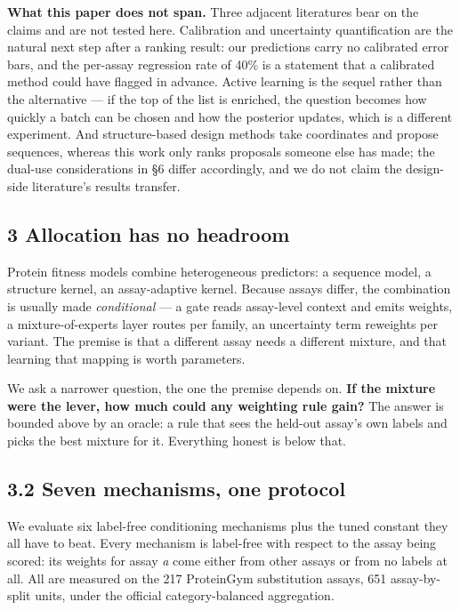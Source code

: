 \textbf{What this paper does not span.} Three adjacent literatures bear on the claims and are not tested
here. Calibration and uncertainty quantification are the natural next step after a ranking result: our
predictions carry no calibrated error bars, and the per-assay regression rate of 40\% is a statement that
a calibrated method could have flagged in advance. Active learning is the sequel rather than the
alternative --- if the top of the list is enriched, the question becomes how quickly a batch can be chosen
and how the posterior updates, which is a different experiment. And structure-based design methods take
coordinates and propose sequences, whereas this work only ranks proposals someone else has made; the
dual-use considerations in §6 differ accordingly, and we do not claim the design-side literature's
results transfer.

\hypertarget{allocation-has-no-headroom}{%
\subsection{3 Allocation has no headroom}\label{allocation-has-no-headroom}}

Protein fitness models combine heterogeneous predictors: a sequence model, a structure kernel, an
assay-adaptive kernel. Because assays differ, the combination is usually made \emph{conditional} --- a gate
reads assay-level context and emits weights, a mixture-of-experts layer routes per family, an
uncertainty term reweights per variant. The premise is that a different assay needs a different
mixture, and that learning that mapping is worth parameters.

We ask a narrower question, the one the premise depends on. \textbf{If the mixture were the lever, how much
could any weighting rule gain?} The answer is bounded above by an oracle: a rule that sees the
held-out assay's own labels and picks the best mixture for it. Everything honest is below that.

\hypertarget{seven-mechanisms-one-protocol}{%
\subsection{3.2 Seven mechanisms, one protocol}\label{seven-mechanisms-one-protocol}}

We evaluate six label-free conditioning mechanisms plus the tuned constant they all have to beat. Every
mechanism is label-free with respect to the assay being scored: its weights for assay \emph{a} come either
from other assays or from no labels at all. All are measured on the 217 ProteinGym substitution assays,
651 assay-by-split units, under the official category-balanced aggregation.

